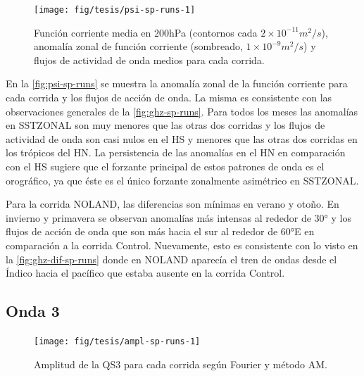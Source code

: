 \documentclass[spanish,a4paper,12pt,oneside]{book}
\begin{document}
\begin{landscape}\begin{figure}

{\centering \texttt{[image: fig/tesis/psi-sp-runs-1]} 

}

\caption{Función corriente media en 200hPa (contornos cada $2\times10^{-11}m^2/s$), anomalía zonal de función corriente (sombreado,  $1\times10^{-9}m^2/s$) y flujos de actividad de onda medios para cada corrida.}\label{fig:psi-sp-runs}
\end{figure}
\end{landscape}

En la \autoref{fig:psi-sp-runs} se muestra la anomalía zonal de la
función corriente para cada corrida y los flujos de acción de onda. La
misma es consistente con las observaciones generales de la
\autoref{fig:ghz-sp-runs}. Para todos los meses las anomalías en
SSTZONAL son muy menores que las otras dos corridas y los flujos de
actividad de onda son casi nulos en el HS y menores que las otras dos
corridas en los trópicos del HN. La persistencia de las anomalías en el
HN en comparación con el HS sugiere que el forzante principal de estos
patrones de onda es el orográfico, ya que éste es el único forzante
zonalmente asimétrico en SSTZONAL.

Para la corrida NOLAND, las diferencias son mínimas en verano y otoño.
En invierno y primavera se observan anomalías más intensas al rededor de
30° y los flujos de acción de onda que son más hacia el sur al rededor
de 60°E en comparación a la corrida Control. Nuevamente, esto es
consistente con lo visto en la \autoref{fig:ghz-dif-sp-runs} donde en
NOLAND aparecía el tren de ondas desde el Índico hacia el pacífico que
estaba ausente en la corrida Control.

\subsection{Onda 3}\label{onda-3-2}

\begin{landscape}\begin{figure}

{\centering \texttt{[image: fig/tesis/ampl-sp-runs-1]} 

}

\caption{Amplitud de la QS3 para cada corrida según Fourier y método AM.}\label{fig:ampl-sp-runs}
\end{figure}
\end{landscape}
\end{document}
